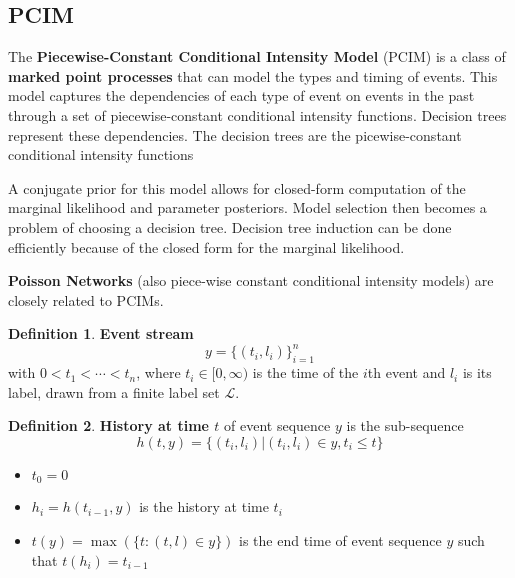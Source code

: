 \documentclass[12pt]{article}
\theoremstyle{plain}
\theoremstyle{definition}
\newtheorem{definition}{Definition}
\theoremstyle{remark}
\begin{document}
\subsection{PCIM}

  The \textbf{Piecewise-Constant Conditional Intensity Model} (PCIM) is a class
  of \textbf{marked point processes} that can model the types and timing of
  events.
  This model captures the dependencies of each type of event on events in the
  past through a set of piecewise-constant conditional intensity functions.
  Decision trees represent these dependencies. The decision trees are the
  picewise-constant conditional intensity functions \citep{gunmeexu11}

  A conjugate prior for this model allows for closed-form computation of the
  marginal likelihood and parameter posteriors.
  Model selection then becomes a problem of choosing a decision tree.
  Decision tree induction can be done efficiently because of the closed form for
  the marginal likelihood.

  \textbf{Poisson Networks} \citep{rajgraher05} (also piece-wise constant
  conditional intensity models) are closely related to PCIMs.

\begin{definition}
  \textbf{Event stream}
\begin{equation*}
  y = \{(t_i,l_i)\}_{i=1}^n
\end{equation*}
with $0 < t_1 < \cdots < t_n$, where $t_i \in [0, \infty)$ is the time of the
$i$th event and $l_i$ is its label, drawn from a finite label set $\mathcal{L}$.
\end{definition}

\begin{definition}
  \textbf{History at time $t$} of event sequence $y$ is the sub-sequence
\begin{equation*}
  h(t,y) = \{(t_i,l_i)|(t_i,l_i) \in y,t_i \leq t\}
\end{equation*}
\begin{itemize}
  \item $t_0 = 0$
  \item $h_i = h(t_{i-1},y)$ is the history at time $t_i$
  \item $t(y) = \max(\{t:(t,l) \in y\})$ is the end time of event
    sequence $y$ such that $t(h_i) = t_{i-1}$
\end{itemize}
\end{definition}
\end{document}

